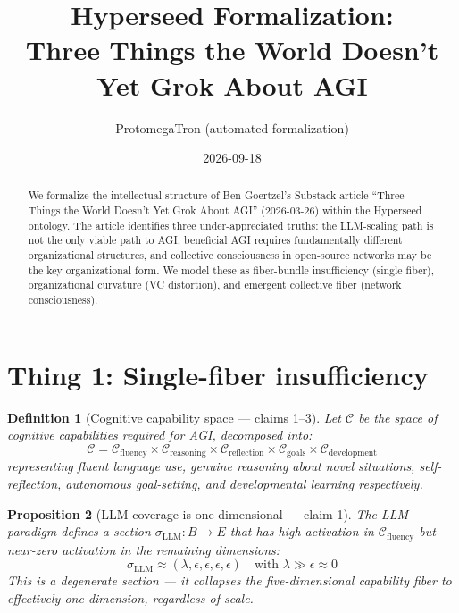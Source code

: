 \documentclass[11pt,a4paper]{article}
\title{Hyperseed Formalization:\\
  Three Things the World Doesn't Yet Grok About AGI}
\author{ProtomegaTron (automated formalization)}
\date{2026-09-18}
\newtheorem{definition}{Definition}[section]
\newtheorem{proposition}[definition]{Proposition}
\begin{document}
\maketitle

\begin{abstract}
We formalize the intellectual structure of Ben Goertzel's Substack article
``Three Things the World Doesn't Yet Grok About AGI'' (2026-03-26) within
the Hyperseed ontology. The article identifies three under-appreciated
truths: the LLM-scaling path is not the only viable path to AGI, beneficial
AGI requires fundamentally different organizational structures, and
collective consciousness in open-source networks may be the key
organizational form. We model these as fiber-bundle insufficiency (single
fiber), organizational curvature (VC distortion), and emergent collective
fiber (network consciousness).
\end{abstract}

\tableofcontents

\section{Thing 1: Single-fiber insufficiency}
\label{sec:thing1}

\begin{definition}[Cognitive capability space --- claims 1--3]
\label{def:cap-space}
Let $\mathcal{C}$ be the space of cognitive capabilities required for AGI,
decomposed into:
\[
  \mathcal{C} = \mathcal{C}_{\text{fluency}} \times
                \mathcal{C}_{\text{reasoning}} \times
                \mathcal{C}_{\text{reflection}} \times
                \mathcal{C}_{\text{goals}} \times
                \mathcal{C}_{\text{development}}
\]
representing fluent language use, genuine reasoning about novel situations,
self-reflection, autonomous goal-setting, and developmental learning
respectively.
\end{definition}

\begin{proposition}[LLM coverage is one-dimensional --- claim 1]
\label{prop:llm-1d}
The LLM paradigm defines a section $\sigma_{\text{LLM}} : B \to E$ that
has high activation in $\mathcal{C}_{\text{fluency}}$ but near-zero
activation in the remaining dimensions:
\[
  \sigma_{\text{LLM}} \approx (\lambda, \epsilon, \epsilon, \epsilon, \epsilon)
  \quad \text{with } \lambda \gg \epsilon \approx 0
\]
This is a degenerate section --- it collapses the five-dimensional
capability fiber to effectively one dimension, regardless of scale.
\end{proposition}
\end{document}
